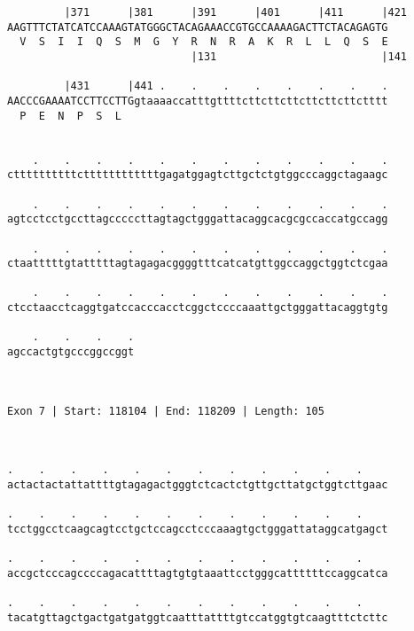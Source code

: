 \documentclass{article}
\begin{document}
\begin{Verbatim}
         |371      |381      |391      |401      |411      |421
AAGTTTCTATCATCCAAAGTATGGGCTACAGAAACCGTGCCAAAAGACTTCTACAGAGTG
  V  S  I  I  Q  S  M  G  Y  R  N  R  A  K  R  L  L  Q  S  E
                             |131                          |141
  
         |431      |441 .    .    .    .    .    .    .    .
AACCCGAAAATCCTTCCTTGgtaaaaccatttgttttcttcttcttcttcttcttctttt
  P  E  N  P  S  L                                          
                                                            
  
    .    .    .    .    .    .    .    .    .    .    .    .
cttttttttttcttttttttttttgagatggagtcttgctctgtggcccaggctagaagc
                                                            
    .    .    .    .    .    .    .    .    .    .    .    .
agtcctcctgccttagcccccttagtagctgggattacaggcacgcgccaccatgccagg
                                                            
    .    .    .    .    .    .    .    .    .    .    .    .
ctaatttttgtatttttagtagagacggggtttcatcatgttggccaggctggtctcgaa
                                                            
    .    .    .    .    .    .    .    .    .    .    .    .
ctcctaacctcaggtgatccacccacctcggctccccaaattgctgggattacaggtgtg
                                                            
    .    .    .    .
agccactgtgcccggccggt
                    
                    
 
Exon 7 | Start: 118104 | End: 118209 | Length: 105



.    .    .    .    .    .    .    .    .    .    .    .    
actactactattattttgtagagactgggtctcactctgttgcttatgctggtcttgaac
                                                            
.    .    .    .    .    .    .    .    .    .    .    .    
tcctggcctcaagcagtcctgctccagcctcccaaagtgctgggattataggcatgagct
                                                            
.    .    .    .    .    .    .    .    .    .    .    .    
accgctcccagccccagacattttagtgtgtaaattcctgggcattttttccaggcatca
                                                            
.    .    .    .    .    .    .    .    .    .    .    .    
tacatgttagctgactgatgatggtcaatttattttgtccatggtgtcaagtttctcttc
                                                            

\end{Verbatim}
\end{document}
